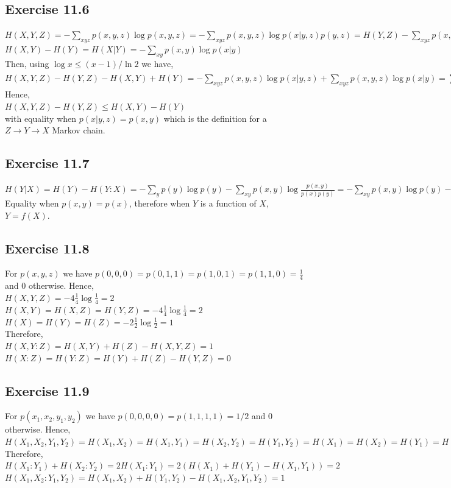 \documentclass[a4paper,12pt]{article}
\begin{document}
\subsection*{Exercise 11.6}
$H(X,Y,Z)=-\displaystyle\sum_{xyz}p(x,y,z)\log{p(x,y,z)}=
-\sum_{xyz}p(x,y,z)\log{p(x|y,z)p(y,z)}=H(Y,Z)-\sum_{xyz}p(x,y,z)\log{p(x|y,z)}$\\
$H(X,Y)-H(Y)=H(X|Y)=-\displaystyle\sum_{xy}p(x,y)\log{p(x|y)}$\\
Then, using $\log{x}\leq (x-1)/\ln{2}$ we have,\\
$H(X,Y,Z)-H(Y,Z)-H(X,Y)+H(Y)=-\displaystyle\sum_{xyz}p(x,y,z)\log{p(x|y,z)}+\sum_{xyz}p(x,y,z)\log{p(x|y)}=
\sum_{xyz}p(x,y,z)\log{\frac{p(x|y)}{p(x|y,z)}}\leq \frac{1}{\ln{2}}\sum_{xyz}p(x,y,z)\left(
\frac{p(x|y)}{p(x|y,z)}-1\right)=\frac{1}{\ln{2}}\sum_{xyz}(p(x|y)p(y,z)-p(x,y,z))=
\frac{1}{\ln{2}}\left(\sum_{xy}p(x|y)p(y)-1\right)=
\frac{1}{\ln{2}}\left(\sum_{xy}p(x,y)-1\right)=\frac{1}{\ln{2}}(1-1)=0$\\
Hence,\\
$H(X,Y,Z)-H(Y,Z)\leq H(X,Y)-H(Y)$\\
with equality when $p(x|y,z)=p(x,y)$ which is the definition for a $Z\rightarrow Y\rightarrow X$
Markov chain.
\subsection*{Exercise 11.7}
$H(Y|X)=H(Y)-H(Y:X)=-\displaystyle\sum_yp(y)\log{p(y)}-
\sum_{xy}p(x,y)\log{\frac{p(x,y)}{p(x)p(y)}}=
-\sum_{xy}p(x,y)\log{p(y)}-\sum_{xy}p(x,y)\log{\frac{p(x,y)}{p(x)p(y)}}
=\sum_{xy}p(x,y)\log{\frac{p(x,y)}{p(x)}}=-H(p(x,y)||p(x))\geq 0$\\
Equality when $p(x,y)=p(x)$, therefore when $Y$ is a function of $X$, $Y=f(X)$.
\subsection*{Exercise 11.8}
For $p(x,y,z)$ we have
$p(0,0,0)=p(0,1,1)=p(1,0,1)=p(1,1,0)=\frac{1}{4}$ and $0$ otherwise. Hence,\\
$H(X,Y,Z)=-4\frac{1}{4}\log{\frac{1}{4}}=2$\\
$H(X,Y)=H(X,Z)=H(Y,Z)=-4\frac{1}{4}\log{\frac{1}{4}}=2$\\
$H(X)=H(Y)=H(Z)=-2\frac{1}{2}\log{\frac{1}{2}}=1$\\
Therefore,\\
$H(X,Y:Z)=H(X,Y)+H(Z)-H(X,Y,Z)=1$\\
$H(X:Z)=H(Y:Z)=H(Y)+H(Z)-H(Y,Z)=0$
\subsection*{Exercise 11.9}
For $p(x_1,x_2,y_1,y_2)$ we have $p(0,0,0,0)=p(1,1,1,1)=1/2$ and $0$ otherwise. Hence,\\
$H(X_1,X_2,Y_1,Y_2)=H(X_1,X_2)=H(X_1,Y_1)=H(X_2,Y_2)=H(Y_1,Y_2)=H(X_1)=H(X_2)=H(Y_1)=H(Y_2)=
-2\frac{1}{2}\log{\frac{1}{2}}=1$\\
Therefore,\\
$H(X_1:Y_1)+H(X_2:Y_2)=2H(X_1:Y_1)=2(H(X_1)+H(Y_1)-H(X_1,Y_1))=2$\\
$H(X_1,X_2:Y_1,Y_2)=H(X_1,X_2)+H(Y_1,Y_2)-H(X_1,X_2,Y_1,Y_2)=1$
\end{document}
